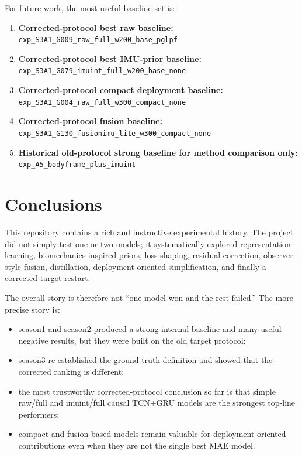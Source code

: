 \documentclass[11pt,a4paper]{article}
\begin{document}
For future work, the most useful baseline set is:

\begin{enumerate}
\item \textbf{Corrected-protocol best raw baseline:} \texttt{exp\_S3A1\_G009\_raw\_full\_w200\_base\_pglpf}
\item \textbf{Corrected-protocol best IMU-prior baseline:} \texttt{exp\_S3A1\_G079\_imuint\_full\_w200\_base\_none}
\item \textbf{Corrected-protocol compact deployment baseline:} \texttt{exp\_S3A1\_G004\_raw\_full\_w300\_compact\_none}
\item \textbf{Corrected-protocol fusion baseline:} \texttt{exp\_S3A1\_G130\_fusionimu\_lite\_w300\_compact\_none}
\item \textbf{Historical old-protocol strong baseline for method comparison only:} \texttt{exp\_A5\_bodyframe\_plus\_imuint}
\end{enumerate}

\section{Conclusions}

This repository contains a rich and instructive experimental history. The project did not simply test one or two models; it systematically explored representation learning, biomechanics-inspired priors, loss shaping, residual correction, observer-style fusion, distillation, deployment-oriented simplification, and finally a corrected-target restart.

The overall story is therefore not ``one model won and the rest failed.'' The more precise story is:

\begin{itemize}
\item season1 and season2 produced a strong internal baseline and many useful negative results, but they were built on the old target protocol;
\item season3 re-established the ground-truth definition and showed that the corrected ranking is different;
\item the most trustworthy corrected-protocol conclusion so far is that simple raw/full and imuint/full causal TCN+GRU models are the strongest top-line performers;
\item compact and fusion-based models remain valuable for deployment-oriented contributions even when they are not the single best MAE model.
\end{itemize}
\end{document}
